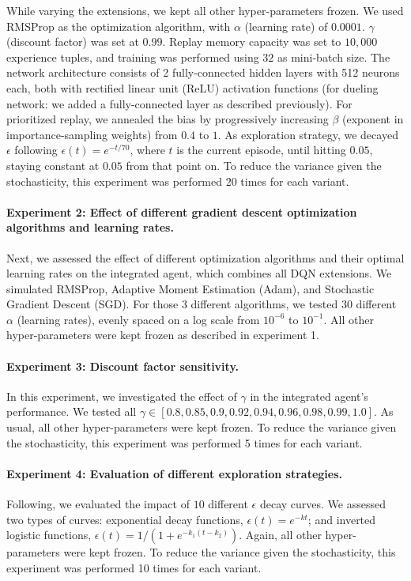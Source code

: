 \documentclass{article}
\begin{document}
    While varying the extensions, we kept all other hyper-parameters frozen.
    We used RMSProp as the optimization algorithm, with $\alpha$ (learning rate) of $0.0001$.
    $\gamma$ (discount factor) was set at $0.99$.
    Replay memory capacity was set to $10,000$ experience tuples, and training was performed using $32$ as mini-batch size.
    The network architecture consists of 2 fully-connected hidden layers with 512 neurons each, both with rectified linear unit (ReLU) activation functions (for dueling network: we added a fully-connected layer as described previously).
    For prioritized replay, we annealed the bias by progressively increasing $\beta$ (exponent in importance-sampling weights) from $0.4$ to $1$.
    As exploration strategy, we decayed $\epsilon$ following $\epsilon(t) = e^{-t/70}$, where $t$ is the current episode, until hitting $0.05$, staying constant at $0.05$ from that point on.
    To reduce the variance given the stochasticity, this experiment was performed 20 times for each variant.

    \paragraph{Experiment 2: Effect of different gradient descent optimization algorithms and learning rates.}
    Next, we assessed the effect of different optimization algorithms and their optimal learning rates on the integrated agent, which combines all DQN extensions.
    We simulated RMSProp, Adaptive Moment Estimation (Adam), and Stochastic Gradient Descent (SGD).
    For those 3 different algorithms, we tested $30$ different $\alpha$ (learning rates), evenly spaced on a log scale from $10^{-6}$ to $10^{-1}$.
    All other hyper-parameters were kept frozen as described in experiment 1.

    \paragraph{Experiment 3: Discount factor sensitivity.}
    In this experiment, we investigated the effect of $\gamma$ in the integrated agent's performance.
    We tested all $\gamma \in [0.8, 0.85, 0.9, 0.92, 0.94, 0.96, 0.98, 0.99, 1.0]$.
    As usual, all other hyper-parameters were kept frozen.
    To reduce the variance given the stochasticity, this experiment was performed 5 times for each variant.

    \paragraph{Experiment 4: Evaluation of different exploration strategies.}
    Following, we evaluated the impact of $10$ different $\epsilon$ decay curves.
    We assessed two types of curves: exponential decay functions, $\epsilon(t) = e^{-k t}$; and inverted logistic functions, $\epsilon(t) = 1 / (1 + e^{-k_{1} (t - k_{2})})$.
    Again, all other hyper-parameters were kept frozen.
    To reduce the variance given the stochasticity, this experiment was performed 10 times for each variant.
\end{document}
